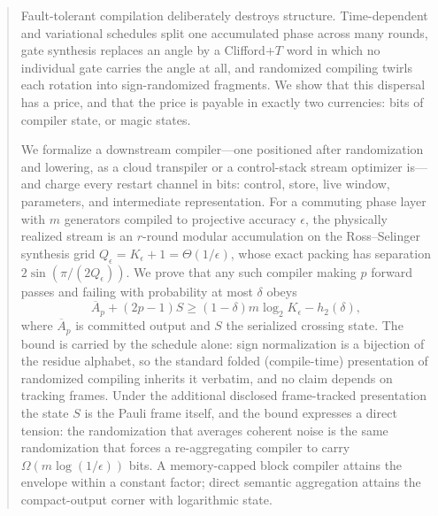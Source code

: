 \documentclass[aps,prx,reprint,floatfix,superscriptaddress]{revtex4-2}
\begin{document}
\begin{abstract}
Fault-tolerant compilation deliberately destroys structure.
Time-dependent and variational schedules split one accumulated phase
across many rounds, gate synthesis replaces an angle by a Clifford+$T$
word in which no individual gate carries the angle at all, and
randomized compiling twirls each rotation into sign-randomized
fragments.
We show that this dispersal has a price, and that the price is payable
in exactly two currencies: bits of compiler state, or magic states.

We formalize a downstream compiler---one positioned after randomization
and lowering, as a cloud transpiler or a control-stack stream optimizer
is---and charge every restart channel in bits: control, store, live
window, parameters, and intermediate representation.  For a commuting
phase layer with $m$ generators compiled to projective accuracy
$\epsilon$, the physically realized stream is an $r$-round modular
accumulation on the Ross--Selinger synthesis grid
$Q_\epsilon=K_\epsilon+1=\Theta(1/\epsilon)$, whose exact packing has
separation $2\sin(\pi/(2Q_\epsilon))$.  We prove that any such compiler
making $p$ forward passes and failing with probability at most $\delta$
obeys
\begin{equation*}
 \overline A_p+(2p-1)S\geq
 (1-\delta)m\log_2K_\epsilon-h_2(\delta),
\end{equation*}
where $\overline A_p$ is committed output and $S$ the serialized
crossing state.
The bound is carried by the schedule alone: sign normalization is a
bijection of the residue alphabet, so the standard folded
(compile-time) presentation of randomized compiling inherits it
verbatim, and no claim depends on tracking frames.  Under the
additional disclosed frame-tracked presentation the state $S$ is the
Pauli frame itself, and the bound expresses a direct tension: the
randomization that averages coherent noise is the same randomization
that forces a
re-aggregating compiler to carry $\Omega(m\log(1/\epsilon))$ bits.  A memory-capped
block compiler attains the envelope within a constant factor; direct
semantic aggregation attains the compact-output corner with logarithmic
state.


\end{abstract}
\end{document}
